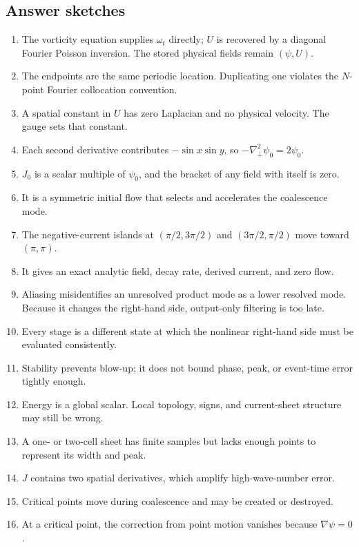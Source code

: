 \documentclass[11pt]{article}
\newcommand{\Lap}{\nabla_{\!\perp}^{2}}
\begin{document}
\subsection*{Answer sketches}

\begin{enumerate}[label=\textbf{A\arabic*.}]
  \item The vorticity equation supplies $\omega_t$ directly; $U$ is recovered by a diagonal Fourier Poisson inversion. The stored physical fields remain $(\psi,U)$.
  \item The endpoints are the same periodic location. Duplicating one violates the $N$-point Fourier collocation convention.
  \item A spatial constant in $U$ has zero Laplacian and no physical velocity. The gauge sets that constant.
  \item Each second derivative contributes $-\sin x\sin y$, so $-\Lap\psi_0=2\psi_0$.
  \item $J_0$ is a scalar multiple of $\psi_0$, and the bracket of any field with itself is zero.
  \item It is a symmetric initial flow that selects and accelerates the coalescence mode.
  \item The negative-current islands at $(\pi/2,3\pi/2)$ and $(3\pi/2,\pi/2)$ move toward $(\pi,\pi)$.
  \item It gives an exact analytic field, decay rate, derived current, and zero flow.
  \item Aliasing misidentifies an unresolved product mode as a lower resolved mode. Because it changes the right-hand side, output-only filtering is too late.
  \item Every stage is a different state at which the nonlinear right-hand side must be evaluated consistently.
  \item Stability prevents blow-up; it does not bound phase, peak, or event-time error tightly enough.
  \item Energy is a global scalar. Local topology, signs, and current-sheet structure may still be wrong.
  \item A one- or two-cell sheet has finite samples but lacks enough points to represent its width and peak.
  \item $J$ contains two spatial derivatives, which amplify high-wave-number error.
  \item Critical points move during coalescence and may be created or destroyed.
  \item At a critical point, the correction from point motion vanishes because $\nabla\psi=0$.

\end{enumerate}
\end{document}
